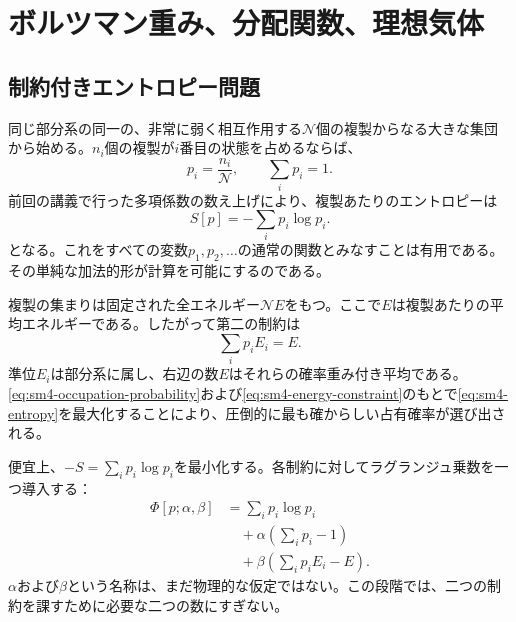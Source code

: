 \chapter{ボルツマン重み、分配関数、理想気体}


\section{制約付きエントロピー問題}

同じ部分系の同一の、非常に弱く相互作用する\(\mathcal N\)個の複製からなる大きな集団から始める。\(n_i\)個の複製が\(i\)番目の状態を占めるならば、
\begin{equation}
 p_i=\frac{n_i}{\mathcal N},
 \qquad
 \sum_i p_i=1.
 \label{eq:sm4-occupation-probability}
\end{equation}
前回の講義で行った多項係数の数え上げにより、複製あたりのエントロピーは
\begin{equation}
 S[p]=-\sum_i p_i\log p_i.
 \label{eq:sm4-entropy}
\end{equation}
となる。これをすべての変数\(p_1,p_2,\ldots\)の通常の関数とみなすことは有用である。その単純な加法的形が計算を可能にするのである。

複製の集まりは固定された全エネルギー\(\mathcal N E\)をもつ。ここで\(E\)は複製あたりの平均エネルギーである。したがって第二の制約は
\begin{equation}
 \sum_i p_iE_i=E.
 \label{eq:sm4-energy-constraint}
\end{equation}
準位\(E_i\)は部分系に属し、右辺の数\(E\)はそれらの確率重み付き平均である。\eqref{eq:sm4-occupation-probability}および\eqref{eq:sm4-energy-constraint}のもとで\eqref{eq:sm4-entropy}を最大化することにより、圧倒的に最も確からしい占有確率が選び出される。

便宜上、\(-S=\sum_i p_i\log p_i\)を最小化する。各制約に対してラグランジュ乗数を一つ導入する：
\begin{equation}
 \begin{aligned}
 \Phi[p;\alpha,\beta]
 &=\sum_i p_i\log p_i\\
 &\quad+\alpha\left(\sum_i p_i-1\right)\\
 &\quad+\beta\left(\sum_i p_iE_i-E\right).
 \end{aligned}
 \label{eq:sm4-augmented-functional}
\end{equation}
\(\alpha\)および\(\beta\)という名称は、まだ物理的な仮定ではない。この段階では、二つの制約を課すために必要な二つの数にすぎない。

